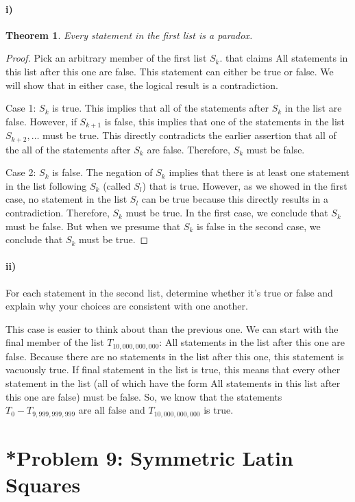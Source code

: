 \documentclass[10pt,letter]{article}
\newtheorem*{thm}{Theorem}
\begin{document}
\paragraph{i)}
\begin{thm}Every statement in the first list is a paradox.\end{thm}
\begin{proof}Pick an arbitrary member of the first list $S_k$. that claims All statements in this list after this one are false. This statement can either be true or false. We will show that in either case, the logical result is a contradiction.
\item Case 1: $S_k$ is true. This implies that all of the statements after $S_k$ in the list are false. However, if $S_{k+1}$ is false, this implies that one of the statements in the list $S_{k+2}, \ldots$ must be true. This directly contradicts the earlier assertion that all of the all of the statements after $S_k$ are false. Therefore, $S_k$ must be false.
\item Case 2: $S_k$ is false. The negation of $S_k$ implies that there is at least one statement in the list following $S_k$ (called $S_l$) that is true. However, as we showed in the first case, no statement in the list $S_l$ can be true because this directly results in a contradiction. Therefore, $S_k$ must be true.
In the first case, we conclude that $S_k$ must be false. But when we presume that $S_k$ is false in the second case, we conclude that $S_k$ must be true. 
\end{proof}

\paragraph{ii)} For each statement in the second list, determine whether it's true or false and explain why your choices are consistent with one another.

This case is easier to think about than the previous one. We can start with the final member of the list $T_{10,000,000,000}$: All statements in the list after this one are false. Because there are no statements in the list after this one, this statement is vacuously true. If final statement in the list is true, this means that every other statement in the list (all of which have the form All statements in this list after this one are false) must be false. So, we know that the statements $T_0 - T_{9,999,999,999}$ are all false and $T_{10,000,000,000}$ is true.

\section*{*Problem 9: Symmetric Latin Squares}
\end{document}
